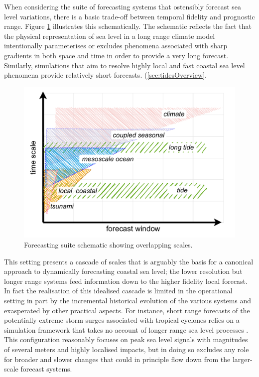When considering the suite of forecasting systems that ostensibly forecast sea level variations, there is a basic trade-off between temporal fidelity and prognostic range.    Figure \ref{fig:forecastScalesAll} illustrates this schematically.    The schematic reflects the fact that the physical representation of sea level in a long range climate model intentionally parameterises or excludes phenomena associated with sharp gradients in both space and time in order to provide a very long forecast.  Similarly, simulations that aim to resolve highly local and fast coastal sea level phenomena provide relatively short forecasts.    
(\ref{sec:tidesOverview}.    
\begin{figure}[H]\centering
  \includegraphics[width=\figwidthBig]{figures/diagrams/scales.pdf}
  \caption{Forecasting suite schematic showing overlapping scales.}
  \label{fig:forecastScalesAll}
\end{figure}
This setting presents a cascade of scales that is arguably the basis for a canonical approach to dynamically forecasting coastal sea level; the lower resolution but longer range systems feed information down to the higher fidelity local forecast.    In fact the realisation of this idealised cascade is limited in the operational setting in part by the incremental historical evolution of the various systems and exasperated by other practical aspects.
For instance, short range forecasts of the potentially extreme storm surges associated with tropical cyclones relies on a simulation framework that takes no account of longer range sea level processes \citep{BRR-031}.   This configuration reasonably focuses on peak sea level signals with magnitudes of several meters and highly localised impacts, but in doing so excludes any role for broader and slower changes that could in principle flow down from the larger-scale forecast systems.

